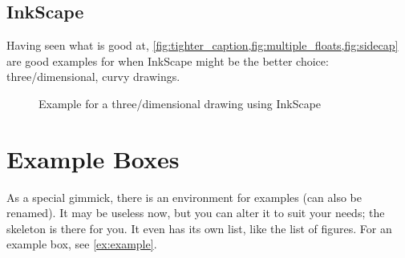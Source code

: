 \subsection{InkScape}

Having seen what  is good at,
\cref{fig:tighter_caption,fig:multiple_floats,fig:sidecap}
are good examples for when InkScape might be the better choice:
three\-/dimensional, curvy drawings.

\begin{figure}[tbp]

    \centering
    
    \caption{%
        Example for a three\-/dimensional drawing using InkScape%
    }
    \label{fig:tighter_caption}
\end{figure}

\section{Example Boxes}

As a special gimmick, there is an environment for examples (can also be renamed).
It may be useless now, but you can alter it to suit your needs; the skeleton is
there for you.
It even has its own list, like the list of figures.
For an example box, see \cref{ex:example}.

